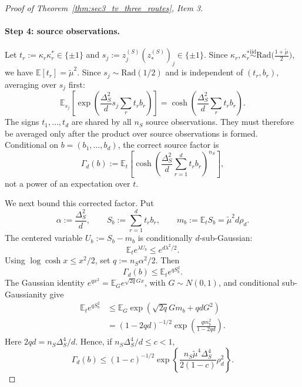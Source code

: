 \documentclass[10pt]{article}
\newcommand{\Ebb}{\mathbb E}
\newcommand{\src}{S}
\newcommand{\nS}{n_{\src}}
\newcommand{\zsrc}{z^{(\src)}}
\newcommand{\DeltaS}{\Delta_{\src}}
\begin{document}
\begin{proof}[Proof of Theorem~\ref{thm:sec3_tv_three_routes}, Item 3]
\paragraph{Step 4: source observations.}
Let $t_r:=\kappa_r\kappa_r^*\in\{\pm1\}$ and
$s_j:=\zsrc_j(\zsrc_*)_j\in\{\pm1\}$. Since
$\kappa_r,\kappa_r^*\overset{\mathrm{iid}}{\sim}\mathrm{Rad}\!\bigl(\frac{1+\tilde\mu}{2}\bigr)$,
we have $\Ebb[t_r]=\tilde\mu^2$. Since $s_j\sim\mathrm{Rad}(1/2)$ and is
independent of $(t_r,b_r)$, averaging over $s_j$ first:
\[
    \Ebb_{s_j}\!\left[\exp\!\left(\frac{\DeltaS^2}{d}s_j\sum_r t_r b_r\right)\right]
    =
    \cosh\!\left(\frac{\DeltaS^2}{d}\sum_r t_r b_r\right).
\]
The signs $t_1,\ldots,t_d$ are shared by all $\nS$ source observations.
They must therefore be averaged only after the product over source
observations is formed.  Conditional on $b=(b_1,\ldots,b_d)$, the correct
source factor is
\begin{equation}
\label{eq:item3-correct-source-factor}
    \Gamma_d(b)
    :=
    \Ebb_t\!\left[
      \cosh\!\left(\frac{\DeltaS^2}{d}\sum_{r=1}^d t_rb_r\right)^{\nS}
    \right],
\end{equation}
not a power of an expectation over $t$.

We next bound this corrected factor.  Put
\[
    \alpha:=\frac{\DeltaS^2}{d},\qquad
    S_b:=\sum_{r=1}^dt_rb_r,\qquad
    m_b:=\Ebb_tS_b=\tilde\mu^2d\rho_d.
\]
The centered variable $U_b:=S_b-m_b$ is conditionally $d$-sub-Gaussian:
\[
    \Ebb_t e^{\lambda U_b}\le e^{d\lambda^2/2}.
\]
Using $\log\cosh x\le x^2/2$, set
$q:=\nS\alpha^2/2$. Then
\[
    \Gamma_d(b)\le \Ebb_t e^{qS_b^2}.
\]
The Gaussian identity $e^{qx^2}=\Ebb_Ge^{\sqrt{2q}Gx}$, with
$G\sim N(0,1)$, and conditional sub-Gaussianity give
\begin{align}
    \Ebb_t e^{qS_b^2}
    &\le
    \Ebb_G\exp\!\left(\sqrt{2q}Gm_b+qdG^2\right)\nonumber\\
    &=
    (1-2qd)^{-1/2}
    \exp\!\left(\frac{qm_b^2}{1-2qd}\right).
    \label{eq:item3-source-gaussian-linearization}
\end{align}
Here $2qd=\nS\DeltaS^4/d$.  Hence, if
$\nS\DeltaS^4/d\le c<1$,
\begin{equation}
\label{eq:item3-correct-source-bound}
    \Gamma_d(b)
    \le
    (1-c)^{-1/2}
    \exp\!\left\{
      \frac{\nS\tilde\mu^4\DeltaS^4}{2(1-c)}\rho_d^2
    \right\}.
\end{equation}


\end{proof}
\end{document}
